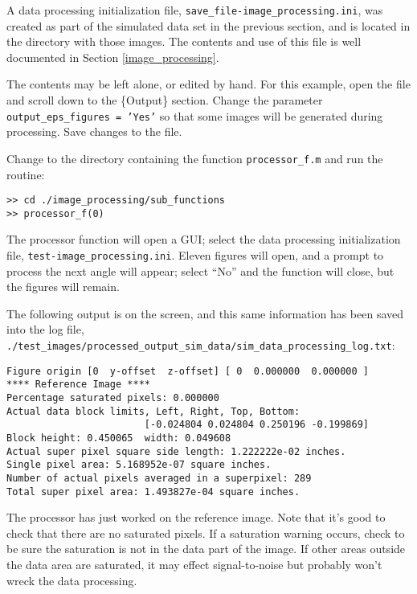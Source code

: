 A data processing initialization file, \texttt{save\_file-image\_processing.ini}, was created as part of the simulated data set in the previous section, and is located in the directory with those images.  The contents and use of this file is well documented in Section \ref{image_processing}.  

The contents may be left alone, or edited by hand.  For this example, open the file and scroll down to the \{Output\} section.  Change the parameter \texttt{output\_eps\_figures =  'Yes'} so that some images will be generated during processing.  Save changes to the file.

Change to the directory containing the function \texttt{processor\_f.m} and run the routine:

\begin{verbatim}
>> cd ./image_processing/sub_functions
>> processor_f(0)
\end{verbatim}

The processor function will open a GUI; select the data processing initialization file, \texttt{test\allowbreak-image\_\allowbreak processing.ini}.  Eleven figures will open, and a prompt to process the next angle will appear; select ``No'' and the function will close, but the figures will remain.

The following output is on the screen, and this same information has been saved into the log file, \texttt{./test\_images/processed\_output\_sim\_data/sim\_data\_processing\_log.txt}:

\begin{verbatim}
Figure origin [0  y-offset  z-offset] [ 0  0.000000  0.000000 ]  
**** Reference Image **** 
Percentage saturated pixels: 0.000000 
Actual data block limits, Left, Right, Top, Bottom: 
                        [-0.024804 0.024804 0.250196 -0.199869] 
Block height: 0.450065  width: 0.049608 
Actual super pixel square side length: 1.222222e-02 inches.
Single pixel area: 5.168952e-07 square inches.
Number of actual pixels averaged in a superpixel: 289
Total super pixel area: 1.493827e-04 square inches.
\end{verbatim}

The processor has just worked on the reference image.  Note that it's good to check that there are no saturated pixels.  If a saturation warning occurs, check to be sure the saturation is not in the data part of the image.  If other areas outside the data area are saturated, it may effect signal-to-noise but probably won't wreck the data processing.

